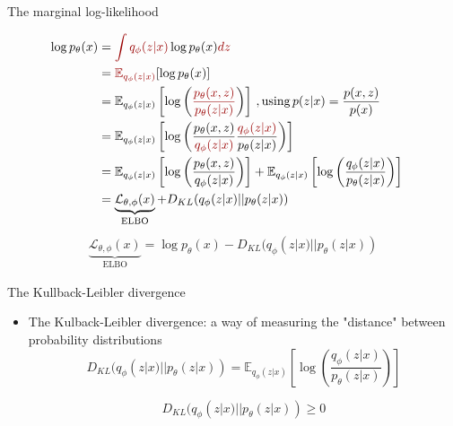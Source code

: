\documentclass[10pt]{beamer}
\begin{document}
\begin{frame}{The marginal log-likelihood}

\begin{align*}
\log p_\theta(x)&={\color{uured}\int q_\phi(z|x)} \log p_\theta(x) {\color{uured} dz}&  \\
&={\color{uured}\mathbb{E}_{q_\phi(z|x)}}[\log p_\theta(x)] \\
&=\mathbb{E}_{q_\phi(z|x)}\left[\log \left({\color{uured}\frac{p_\theta(x,z)}{p_\theta(z|x)}}\right)\right]\,, \text{using}\, p(z|x)= \frac{p(x,z)}{p(x)} \\
&=\mathbb{E}_{q_\phi(z|x)}\left[\log \left(\frac{p_\theta(x,z)}{{\color{uured}q_\phi(z|x)}}\frac{{\color{uured}q_\phi(z|x)}}{p_\theta(z|x)}\right)\right] \\
&=\mathbb{E}_{q_\phi(z|x)}\left[\log \left(\frac{p_\theta(x,z)}{q_\phi(z|x)}\right)\right] + \mathbb{E}_{q_\phi(z|x)}\left[\log \left(\frac{q_\phi(z|x)}{p_\theta(z|x)}\right)\right] \\
&=\underbrace{\mathcal{L}_{\theta,\phi}(x)}_{\text{ELBO}} + D_{KL}(q_\phi(z|x)||p_\theta(z|x))\\
\end{align*}
\pause
\begin{align*}
\underbrace{\mathcal{L}_{\theta,\phi}(x)}_{\text{ELBO}} = \log p_\theta(x) - D_{KL}(q_\phi(z|x)||p_\theta(z|x))
\end{align*}

\end{frame}


\begin{frame}{The Kullback-Leibler divergence}

\begin{itemize}
\item {\color{uured} The Kulback-Leibler divergence}: a way of measuring the "distance" between probability distributions
\[
D_{KL}(q_\phi(z|x)||p_\theta(z|x)) = \mathbb{E}_{q_\phi(z|x)}\left[\log \left(\frac{q_\phi(z|x)}{p_\theta(z|x)}\right)\right]
\]

\[
D_{KL}(q_\phi(z|x)||p_\theta(z|x)) \geq 0
\]
\end{itemize}

\end{frame}
\end{document}
